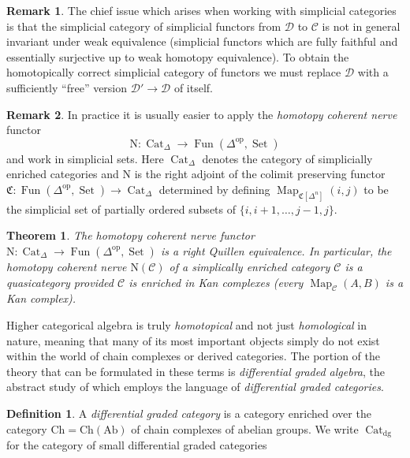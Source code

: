 \documentclass[12pt]{article}
\newtheorem{theorem}{Theorem}[subsection]
\theoremstyle{definition}
\newtheorem{definition}{Definition}[subsection]
\newtheorem{remark}{Remark}[subsection]
\newcommand{\C}{\mathcal{C}}
\newcommand{\D}{\mathcal{D}}
\newcommand{\CCC}{\mathfrak{C}}
\newcommand{\too}{\longrightarrow}
\newcommand{\op}{\mathrm{op}}
\DeclareMathOperator{\Cat}{Cat}
\DeclareMathOperator{\Fun}{Fun}
\DeclareMathOperator{\Map}{Map}
\DeclareMathOperator{\Set}{Set}
\newcommand{\Ab}{\mathrm{Ab}}
\begin{document}
\begin{remark}
The chief issue which arises when working with simplicial categories is that the simplicial category of simplicial functors from $\D$ to $\C$ is not in general invariant under weak equivalence (simplicial functors which are fully faithful and essentially surjective up to weak homotopy equivalence).
To obtain the homotopically correct simplicial category of functors we must replace $\D$ with a sufficiently ``free'' version $\D'\to\D$ of itself.
\end{remark}
\begin{remark}
In practice it is usually easier to apply the {\em homotopy coherent nerve} functor
\[
\mathrm{N}:\Cat_\Delta\too\Fun(\Delta^{\op},\Set)
\]
and work in simplicial sets.
Here $\Cat_\Delta$ denotes the category of simplicially enriched categories and $\mathrm{N}$ is the right adjoint of the colimit preserving functor $\CCC:\Fun(\Delta^{\op},\Set)\to\Cat_\Delta$\index{$\CCC$} determined by defining
$
\Map_{\CCC[\Delta^n]}(i,j)
$
to be the simplicial set of partially ordered subsets of $\{i,i+1,\ldots,j-1,j\}$.
\end{remark}
\begin{theorem}{\em \cite[Theorem 2.2.5.1]{HTT}}
The homotopy coherent nerve functor $\mathrm{N}:\Cat_\Delta\to\Fun(\Delta^{\op},\Set)$ is a right Quillen equivalence.
In particular, the homotopy coherent nerve $\mathrm{N}(\C)$ of a simplically enriched category $\C$ is a quasicategory provided $\C$ is enriched in Kan complexes (every $\Map_\C(A,B)$ is a Kan complex).
\end{theorem}


Higher categorical algebra is truly {\em homotopical} and not just {\em homological} in nature, meaning that many  of its most important objects simply do not exist within the world of chain complexes or derived categories.
The portion of the theory that can be formulated in these terms is {\em differential graded algebra}, the abstract study of which employs the language of {\em differential graded categories}.

\begin{definition}
A {\em differential graded category}
is a category enriched over the category $\mathrm{Ch}=\mathrm{Ch}(\Ab)$ of chain complexes of abelian groups.
We write $\Cat_\mathrm{dg}$\index{$\Cat_\mathrm{dg}$} for the category of small differential graded categories
\end{definition}
\end{document}
